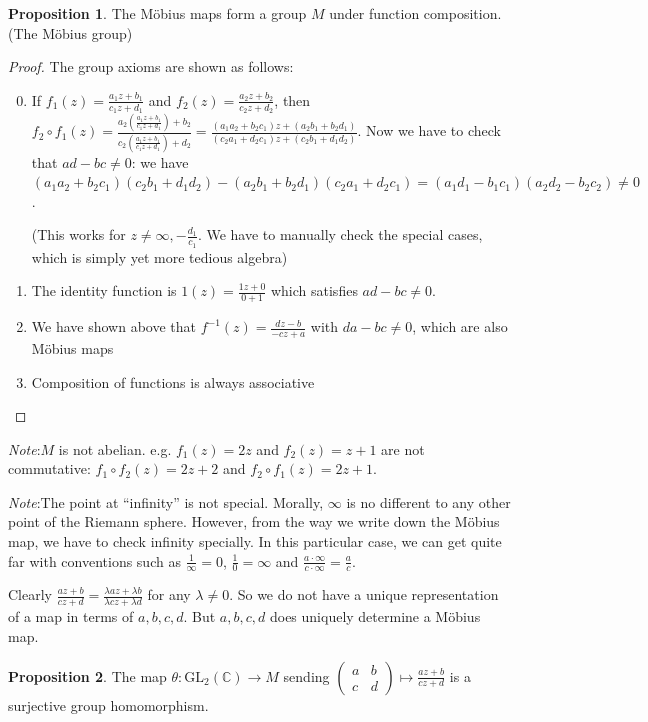\documentclass[a4paper]{article}
\theoremstyle{definition}
\newtheorem*{prop}{Proposition}
\newcommand{\note}{\noindent \emph{Note}:\;}
\newcommand{\C}{\mathbb{C}}
\newcommand{\GL}{\mathrm{GL}}
\begin{document}
\begin{prop}
  The M\"obius maps form a group $M$ under function composition. (The M\"obius group)
\end{prop}
\begin{proof}
  The group axioms are shown as follows:
  \begin{enumerate}[label=\arabic{*}.]
    \setcounter{enumi}{-1}
  \item If $f_1(z) = \frac{a_1z + b_1}{c_1z + d_1}$ and $f_2(z) = \frac{a_2z + b_2}{c_2 z + d_2}$, then $\displaystyle f_2\circ f_1 (z) = \frac{a_2\left(\frac{a_1z + b_1}{c_1z + d_1}\right) + b_2}{c_2\left(\frac{a_1z + b_1}{c_1z + d_1}\right) + d_2} = \frac{(a_1a_2 + b_2c_1)z + (a_2b_1 + b_2d_1)}{(c_2a_1 + d_2c_1)z + (c_2b_1 + d_1d_2)}$. Now we have to check that $ad - bc \not = 0$: we have $(a_1a_2 + b_2c_1)(c_2b_1 + d_1d_2) - (a_2b_1 + b_2d_1)(c_2a_1 + d_2c_1) = (a_1d_1 - b_1c_1)(a_2d_2 - b_2c_2)\not =0 $.

    (This works for $z\not= \infty, -\frac{d_1}{c_1}$. We have to manually check the special cases, which is simply yet more tedious algebra)
  \item The identity function is $1(z) = \frac{1z + 0}{0 + 1}$ which satisfies $ad - bc \not= 0$.
  \item We have shown above that $f^{-1}(z) = \frac{dz - b}{-cz + a}$ with $da - bc\not= 0$, which are also M\"obius maps
  \item Composition of functions is always associative
  \end{enumerate}
\end{proof}
\note $M$ is not abelian. e.g. $f_1(z) = 2z$ and $f_2(z) = z + 1$ are not commutative: $f_1\circ f_2(z) = 2z+2$ and $f_2\circ f_1(z) = 2z + 1$.

\note The point at ``infinity'' is not special. Morally, $\infty$ is no different to any other point of the Riemann sphere. However, from the way we write down the M\"obius map, we have to check infinity specially. In this particular case, we can get quite far with conventions such as $\frac{1}{\infty} = 0$, $\frac{1}{0} = \infty$ and $\frac{a\cdot \infty}{c\cdot \infty} = \frac{a}{c}$.

Clearly $\frac{az + b}{cz + d} = \frac{\lambda az + \lambda b}{\lambda cz + \lambda d}$ for any $\lambda \not= 0$. So we do not have a unique representation of a map in terms of $a, b, c, d$. But $a, b, c, d$ does uniquely determine a M\"obius map.

\begin{prop}
  The map $\theta: \GL_2(\C)\to M$ sending $
  \displaystyle \begin{pmatrix}
    a & b\\
    c & d
  \end{pmatrix} \mapsto \frac{az + b}{cz + d}$ is a surjective group homomorphism.
\end{prop}
\end{document}

